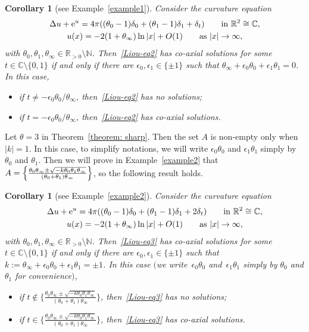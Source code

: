 \documentclass[10pt,a4paper]{amsart}
\numberwithin{equation}{section}
\newtheorem{Corollary}[Theorem]{Corollary}
\def\C{\mathbb C}
\begin{document}
\begin{Corollary}[see Example~\ref{example1}]
Consider the curvature equation
\begin{gather}
 \Delta u+{\rm e}^u=4\pi((\theta_0-1)\delta_0+(\theta_1-1)\delta_1
 +\delta_{t})
 \qquad\text{in}\ \mathbb R^2\cong\C, \nonumber\\
 u(x)=-2(1+\theta_\infty)\ln|x|+O(1) \qquad \text{as} \
 |x|\to\infty, \label{Liou-eq2}
\end{gather}
with $\theta_0,\theta_1,\theta_\infty\in\mathbb{R}_{>0}\setminus \mathbb{N}$. Then~\eqref{Liou-eq2} has co-axial solutions for some $t\in\mathbb{C}\setminus\{0,1\}$ if and only if there are $\epsilon_0,\epsilon_1\in\{\pm1\}$ such that
 $\theta_\infty+\epsilon_0\theta_0+\epsilon_1\theta_1=0$. In this case,
 \begin{itemize}\itemsep=0pt
 \item[$1)$]if $t\neq -\epsilon_0\theta_0/\theta_\infty$, then~\eqref{Liou-eq2} has no solutions;
 \item[$2)$]if $t= -\epsilon_0\theta_0/\theta_\infty$, then~\eqref{Liou-eq2} has co-axial solutions.
 \end{itemize}
\end{Corollary}

Let $\theta=3$ in Theorem~\ref{theorem: sharp}. Then the set $A$ is non-empty
 only when $|k|=1$. In this case,
 to simplify notations, we will write $\epsilon_0\theta_0$ and
 $\epsilon_1\theta_1$ simply by $\theta_0$ and $\theta_1$. Then we will prove in Example~\ref{example2} that $A=\Bigl\{\frac{\theta_0\theta_\infty
 \pm\sqrt{-k\theta_0\theta_1\theta_\infty}}
 {(\theta_0+\theta_1)\theta_\infty}\Bigr\}$, so the following result holds.

 \begin{Corollary}[see Example~\ref{example2}]
Consider the curvature equation
\begin{gather}
 \Delta u+{\rm e}^u=4\pi((\theta_0-1)\delta_0+(\theta_1-1)\delta_1
 +2\delta_{t})
 \qquad\text{in} \ \mathbb R^2\cong\C, \nonumber\\
 u(x)=-2(1+\theta_\infty)\ln|x|+O(1) \qquad \text{as} \
 |x|\to\infty, \label{Liou-eq3}
\end{gather}
with $\theta_0,\theta_1,\theta_\infty\in\mathbb{R}_{>0}\setminus \mathbb{N}$. Then~\eqref{Liou-eq3} has co-axial solutions for some $t\in\mathbb{C}\setminus\{0,1\}$ if and only if there are $\epsilon_0,\epsilon_1\in\{\pm1\}$ such that
 $k:=\theta_\infty+\epsilon_0\theta_0+\epsilon_1\theta_1=\pm 1$. In this case $($we write~$\epsilon_0\theta_0$ and~$\epsilon_1\theta_1$
 simply by $\theta_0$ and $\theta_1$ for convenience$)$,
 \begin{itemize}\itemsep=0pt
 \item[$1)$]if $t\notin\Big\{\frac{\theta_0\theta_\infty
 \pm\sqrt{-k\theta_0\theta_1\theta_\infty}}
 {(\theta_0+\theta_1)\theta_\infty}\Big\}$, then~\eqref{Liou-eq3} has no solutions;
 \item[$2)$]if $t\in\Big\{ \frac{\theta_0\theta_\infty
 \pm\sqrt{-k\theta_0\theta_1\theta_\infty}}
 {(\theta_0+\theta_1)\theta_\infty}\Big\}$, then~\eqref{Liou-eq3} has co-axial solutions.
 \end{itemize}
\end{Corollary}
\end{document}
